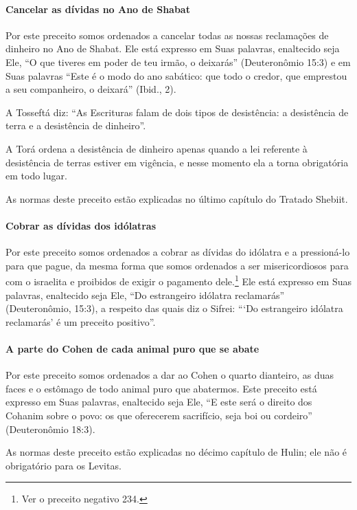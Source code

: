 \paragraph{Cancelar as dívidas no Ano de Shabat}

Por este preceito somos ordenados a cancelar todas as nossas
reclamações de dinheiro no Ano de Shabat. Ele está expresso em Suas
palavras, enaltecido seja Ele, ``O que tiveres em poder de teu irmão, o
deixarás'' (Deuteronômio 15:3) e em Suas palavras ``Este é o modo do
ano sabático: que todo o credor, que emprestou a seu companheiro, o
deixará'' (Ibid., 2).

A Tosseftá diz: ``As Escrituras falam de dois tipos de desistência: a
desistência de terra e a desistência de dinheiro''.

A Torá ordena a desistência de dinheiro apenas quando a lei referente
à desistência de terras estiver em vigência, e nesse momento ela a torna
obrigatória em todo lugar.

As normas deste preceito estão explicadas no último capítulo do Tratado
Shebiit.

\paragraph{Cobrar as dívidas dos idólatras}

Por este preceito somos ordenados a cobrar as dívidas do idólatra e a
pressioná-lo para que pague, da mesma forma que somos ordenados a ser
misericordiosos para com o israelita e proibidos de exigir o pagamento
dele.\footnote{Ver o preceito negativo 234.} Ele está expresso em Suas palavras,
enaltecido seja Ele, ``Do estrangeiro idólatra reclamarás''
(Deuteronômio, 15:3), a respeito das quais diz o Sifrei: ```Do
estrangeiro idólatra reclamarás' é um preceito positivo''.

\paragraph{A parte do Cohen de cada animal puro que se abate}

Por este preceito somos ordenados a dar ao Cohen o quarto
dianteiro, as duas faces e o estômago de todo animal puro que
abatermos. Este preceito está expresso em Suas palavras, enaltecido
seja Ele, ``E este será o direito dos Cohanim sobre o povo: os que
oferecerem sacrifício, seja boi ou cordeiro'' (Deuteronômio 18:3).

As normas deste preceito estão explicadas no décimo capítulo de Hulin;
ele não é obrigatório para os Levitas.

